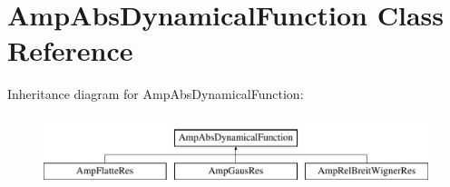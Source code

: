 \hypertarget{class_amp_abs_dynamical_function}{\section{Amp\-Abs\-Dynamical\-Function Class Reference}
\label{class_amp_abs_dynamical_function}
}
Inheritance diagram for Amp\-Abs\-Dynamical\-Function\-:\begin{figure}[H]
\begin{center}
\leavevmode
\includegraphics[height=2.000000cm]{class_amp_abs_dynamical_function}
\end{center}
\end{figure}
